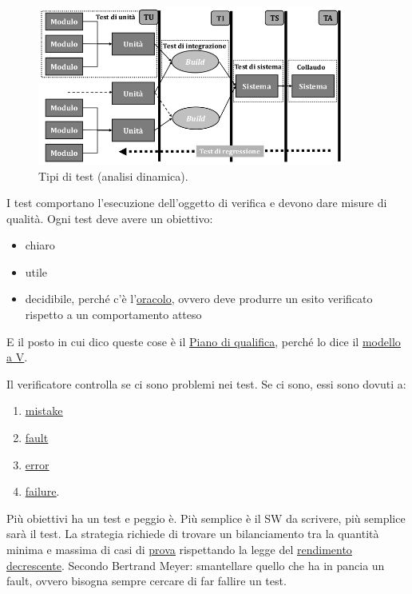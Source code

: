 		\begin{figure}[H]
			\centering
			\includegraphics[width=0.9\textwidth]{img/test}
			\caption{Tipi di test (analisi dinamica).}
		\end{figure}
		I test comportano l'esecuzione dell'oggetto di verifica e devono dare misure di qualità. Ogni test deve avere un obiettivo:
		\begin{itemize}
			\item chiaro
			\item utile
			\item decidibile, perché c'è l'\underline{\hyperref[oracolo]{oracolo}}, ovvero deve produrre un esito verificato rispetto a un comportamento atteso
		\end{itemize}
		E il posto in cui dico queste cose è il \underline{\hyperref[pianoqualifica]{Piano di qualifica}}, perché lo dice il \underline{\hyperref[V]{modello a V}}.

		Il verificatore controlla se ci sono problemi nei test. Se ci sono, essi sono dovuti a:
		\begin{enumerate}
			\item \underline{\hyperref[mistake]{mistake}}
			\item \underline{\hyperref[fault]{fault}}
			\item \underline{\hyperref[error]{error}}
			\item \underline{\hyperref[failure]{failure}}.
		\end{enumerate}
		Più obiettivi ha un test e peggio è. Più semplice è il SW da scrivere, più semplice sarà il test. La strategia richiede di trovare un bilanciamento tra la quantità minima e massima di casi di \underline{\hyperref[prova]{prova}} rispettando la legge del \underline{\hyperref[diminishingreturn]{rendimento decrescente}}.
		Secondo Bertrand Meyer: smantellare quello che ha in pancia un fault, ovvero bisogna sempre cercare di far fallire un test. \\ %


